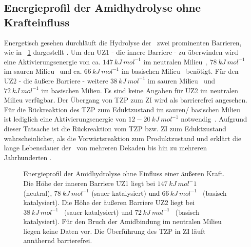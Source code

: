 \subsection{Energieprofil der Amidhydrolyse ohne Krafteinfluss}
\label{subsec:energieprofil_der_amidhydrolyse_ohne_krafteinfluss}
Energetisch gesehen durchläuft die Hydrolyse der \amid~zwei prominenten Barrieren, wie in \abb~\ref{fig:energieprofil_ohne_kraft} dargestellt \cite{Zahn.2003,Zahn.2004,Zahn.2004b}. Um den \ac{UZ}1 - die innere Barriere - zu überwinden wird eine Aktivierungsenergie von ca. $147~kJ~mol^{-1}$ im neutralen Milieu~\cites{Zahn.2004b}, $78~kJ~mol^{-1}$ im sauren Milieu~\cites{Zahn.2003} und ca. $66~kJ~mol^{-1}$ im basischen Milieu~\cites{Zahn.2004} benötigt. Für den \ac{UZ}2 - die äußere Barriere - weitere $38~kJ~mol^{-1}$ im sauren Milieu~\cites{Zahn.2003} und $72~kJ~mol^{-1}$ im basischen Milieu\cites{Zahn.2004}. Es sind keine Angaben für \ac{UZ}2 im neutralen Milieu verfügbar. Der Übergang von \ac{TZP} zum \ac{ZI} wird als barrierefrei angesehen. Für die Rückreaktion des \ac{TZP} zum Eduktzustand im sauren/ basischen Milieu ist lediglich eine Aktivierungsenergie von $12-20~kJ~mol^{-1}$ notwendig~\cite{Zahn.2004,Zahn.2003}. Aufgrund dieser Tatsache ist die Rückreaktion vom \ac{TZP} bzw. \ac{ZI} zum Eduktzustand wahrscheinlicher, als die Vorwärtsreaktion zum Produktzustand und erklärt die lange Lebensdauer der \amid~von mehreren Dekaden bis hin zu mehreren Jahrhunderten \cite{Radzicka.,Berg.2018}.

\begin{figure}[h]
	\centering
	\caption[Energieprofil der Amidhydrolyse ohne Einfluss einer äußeren Kraft]{Energieprofil der Amidhydrolyse ohne Einfluss einer äußeren Kraft. Die Höhe der inneren Barriere \acs*{UZ}1 liegt bei $147~kJ~mol^-1$~\cite{Zahn.2004b} (neutral), $78~kJ~mol^{-1}$\cite{Zahn.2003} (sauer katalysiert) und $66~kJ~mol^{-1}$~\cite{Zahn.2004} (basisch katalysiert). Die Höhe der äußeren Barriere \acs*{UZ}2 liegt bei $38~kJ~mol^{-1}$~\cite{Zahn.2003} (sauer katalysiert) und $72~kJ~mol^{-1}$~\cite{Zahn.2004} (basisch katalysiert). Für den Bruch der Amidbindung im neutralen Milieu liegen keine Daten vor. Die Überführung des \acs*{TZP} in \acs*{ZI} läuft annähernd barrierefrei.}
	\label{fig:energieprofil_ohne_kraft}
\end{figure}

